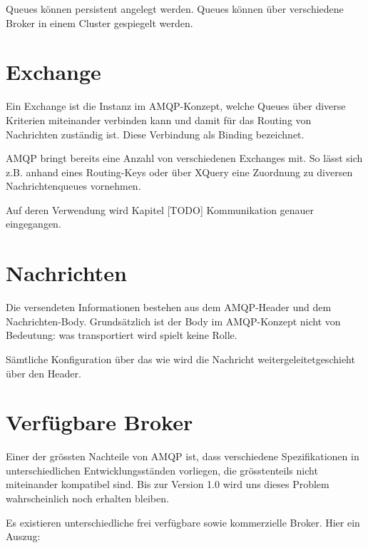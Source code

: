Queues können persistent angelegt werden. Queues können über verschiedene
Broker in einem Cluster gespiegelt werden.


\section{Exchange}

Ein Exchange ist die Instanz im AMQP-Konzept, welche Queues über diverse
Kriterien miteinander verbinden kann und damit für das Routing von
Nachrichten zuständig ist. Diese Verbindung als Binding bezeichnet.

AMQP bringt bereits eine Anzahl von verschiedenen Exchanges mit. So lässt
sich z.B. anhand eines Routing-Keys oder über XQuery eine Zuordnung
zu diversen Nachrichtenqueues vornehmen.

Auf deren Verwendung wird Kapitel [TODO] Kommunikation genauer eingegangen.


\section{Nachrichten}

Die versendeten Informationen bestehen aus dem AMQP-Header und dem
Nachrichten-Body. Grundsätzlich ist der Body im AMQP-Konzept nicht
von Bedeutung: was transportiert wird spielt keine Rolle.

Sämtliche Konfiguration über das \glqq wie wird die Nachricht weitergeleitet\grqq geschieht
über den Header.


\section{Verfügbare Broker}

Einer der grössten Nachteile von AMQP ist, dass verschiedene Spezifikationen
in unterschiedlichen Entwicklungsständen vorliegen, die grösstenteils nicht
miteinander kompatibel sind. Bis zur Version 1.0 wird uns dieses Problem
wahrscheinlich noch erhalten bleiben.

Es existieren unterschiedliche frei verfügbare sowie kommerzielle Broker. Hier
ein Auszug:

